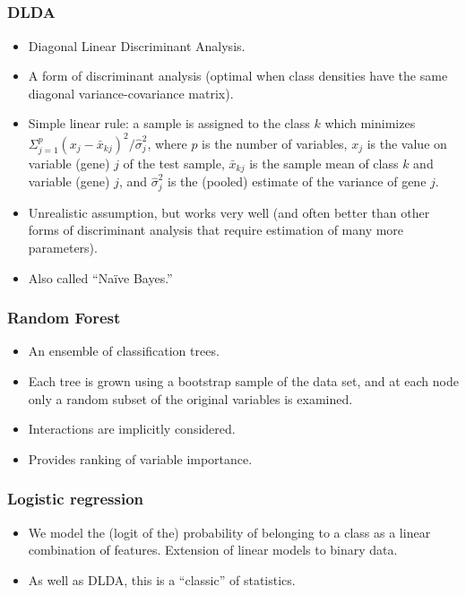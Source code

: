 \subsection{}
\begin{frame}
\frametitle{DLDA}
\begin{itemize}
\item Diagonal Linear Discriminant Analysis.

\item A form of discriminant analysis (optimal when class densities have the same diagonal 
variance-covariance matrix).

\item Simple linear rule:  a sample is
assigned to the class $k$ which minimizes 
$\Sigma_{j = 1}^p (x_j - \bar{x}_{kj})^2/\hat{\sigma}^2_j$,
where $p$ is the number of variables, $x_j$ is the value on variable (gene) $j$ of the test
sample, $\bar{x}_{kj}$ is the sample mean of class $k$
and variable (gene) $j$, and $\hat{\sigma}^2_j$ is
the (pooled) estimate of the variance of gene $j$.
\item Unrealistic assumption, but works very well (and often better than other
  forms of discriminant analysis that require estimation of many more
  parameters).

\item Also called ``Naïve Bayes.''

\end{itemize}



\end{frame}

\begin{frame}
\frametitle{Random Forest}
\begin{itemize}
\item An ensemble of classification trees.

\item Each tree is grown using a
bootstrap sample of the data set, and at each node only a random
subset of the original variables is examined.

\item Interactions are implicitly considered.

\item Provides ranking of variable importance.
\end{itemize}
\end{frame}



\begin{frame}
\frametitle{Logistic regression}
\begin{itemize}
\item We model the (logit of the) probability of belonging to a class as a linear
combination of features. Extension of linear models to binary data.

\item As well as DLDA, this is a ``classic'' of statistics.

\end{itemize}

\end{frame}


